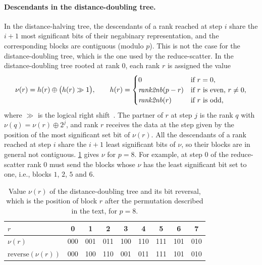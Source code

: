 \paragraph{Descendants in the distance-doubling tree.}
In the distance-halving \bine{} tree, the descendants of a rank reached at step $i$ share the $i+1$ most significant bits of their negabinary representation, and the corresponding blocks are contiguous (modulo $p$).
This is not the case for the distance-doubling tree, which is the one used by the reduce-scatter.
In the distance-doubling \bine{} tree rooted at rank $0$, each rank $r$ is assigned the value
\begin{equation}
  \nu(r)=h(r)\oplus\bigl(h(r)\gg1\bigr),\qquad
  h(r)=
  \begin{cases}
    0 & \text{if } r=0,\\
    \mathit{rank2nb}(p-r) & \text{if $r$ is even, } r\neq0,\\
    \mathit{rank2nb}(r) & \text{if $r$ is odd,}
  \end{cases}
\end{equation}
where $\gg$ is the logical right shift~\cite{desensi2025bine}.
The partner of $r$ at step $j$ is the rank $q$ with $\nu(q)=\nu(r)\oplus2^{j}$, and rank $r$ receives the data at the step given by the position of the most significant set bit of $\nu(r)$.
All the descendants of a rank reached at step $i$ share the $i+1$ least significant bits of $\nu$, so their blocks are in general not contiguous.
\cref{tab:bg-bine-nu} gives $\nu$ for $p=8$.
For example, at step $0$ of the reduce-scatter rank $0$ must send the blocks whose $\nu$ has the least significant bit set to one, i.e., blocks $1$, $2$, $5$ and $6$.

\begin{table}[t]
\centering
\small
\caption{Value $\nu(r)$ of the distance-doubling \bine{} tree and its bit reversal, which is the position of block $r$ after the permutation described in the text, for $p=8$.}
\label{tab:bg-bine-nu}
\begin{tabular}{@{}l*{8}{c}@{}}
\toprule
$r$ & 0 & 1 & 2 & 3 & 4 & 5 & 6 & 7 \\
\midrule
$\nu(r)$ & 000 & 001 & 011 & 100 & 110 & 111 & 101 & 010 \\
$\mathrm{reverse}(\nu(r))$ & 000 & 100 & 110 & 001 & 011 & 111 & 101 & 010 \\
\bottomrule
\end{tabular}
\end{table}

